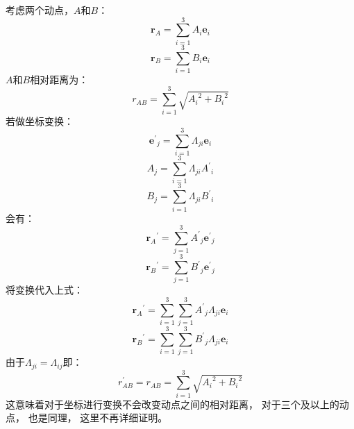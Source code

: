 \documentclass[UTF8,12pt]{ctexart}
\begin{document}
            考虑两个动点，$A$和$B$：
            \begin{equation}
                \textbf{r}_A=\sum_{i=1}^{3}A_i\textbf{e}_i
            \end{equation}
            \begin{equation}
                \textbf{r}_B=\sum_{i=1}^{3}B_i\textbf{e}_i
            \end{equation}
            $A$和$B$相对距离为：
            \begin{equation}
                r_{AB}=\sum_{i=1}^{3}\sqrt{{A_i}^2+{B_i}^2}
            \end{equation}
            若做坐标变换：
            \begin{equation}
                {\textbf{e}^{\prime}}_j=\sum_{i=1}^{3}\Lambda_{ji}\textbf{e}_i
            \end{equation}
            \begin{equation}
                A_j=\sum_{i=1}^{3}\Lambda_{ji}{A^{\prime}}_i
            \end{equation}
            \begin{equation}
                B_j=\sum_{i=1}^{3}\Lambda_{ji}{B^{\prime}}_i
            \end{equation}
            会有：
            \begin{equation}
                {\textbf{r}_A}^{\prime}=\sum_{j=1}^{3}{A^\prime}_j{\textbf{e}^{\prime}}_j
            \end{equation}
            \begin{equation}
                {\textbf{r}_B}^{\prime}=\sum_{j=1}^{3}{B^\prime}_j{\textbf{e}^{\prime}}_j
            \end{equation}
            将变换代入上式：
            \begin{equation}
                {\textbf{r}_A}^{\prime}=\sum_{i=1}^{3}\sum_{j=1}^{3}{A^\prime}_j\Lambda_{ji}\textbf{e}_i
            \end{equation}
            \begin{equation}
                {\textbf{r}_B}^{\prime}=\sum_{i=1}^{3}\sum_{j=1}^{3}{B^\prime}_j\Lambda_{ji}\textbf{e}_i
            \end{equation}
            由于$\Lambda_{ji}=\Lambda_{ij}$即：
            \begin{equation}
                r^\prime_{AB}=r_{AB}=\sum_{i=1}^{3}\sqrt{{A_i}^2+{B_i}^2}
            \end{equation}
            这意味着对于坐标进行变换不会改变动点之间的相对距离，
            对于三个及以上的动点，
            也是同理，
            这里不再详细证明。
\end{document}
